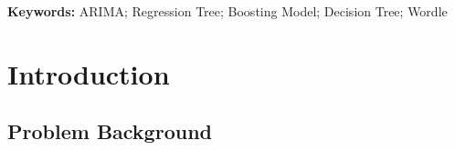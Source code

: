\documentclass[12pt]{article}
\begin{document}
\noindent \textbf{Keywords: }ARIMA; Regression Tree; Boosting Model; Decision Tree; Wordle




\clearpage
\pagestyle{fancy}
\newpage
\setcounter{page}{1}
\tableofcontents
\newpage






\section{Introduction}

\subsection{Problem Background}
\end{document}
